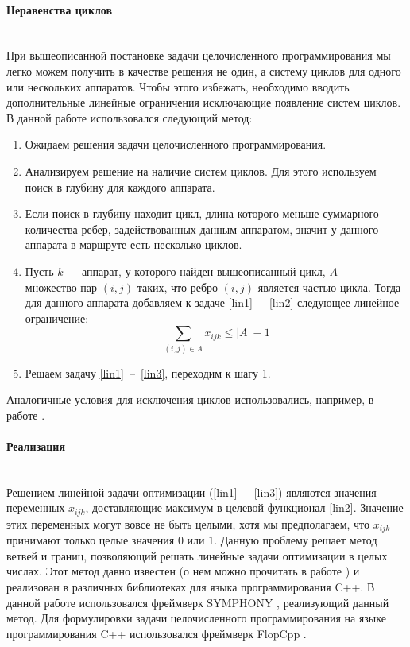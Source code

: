 \documentclass[a4paper,14pt,russian]{article}
\begin{document}
\paragraph{Неравенства циклов} ~\\

При вышеописанной постановке задачи целочисленного программирования мы легко можем получить в качестве решения не один, а систему циклов для одного или нескольких аппаратов. Чтобы этого избежать, необходимо вводить дополнительные линейные ограничения исключающие появление систем циклов. В данной работе использовался следующий метод:
\begin{enumerate}
\item  Ожидаем решения задачи целочисленного программирования.
\item Анализируем решение на наличие систем циклов. Для этого используем поиск в глубину для каждого аппарата.
\item Если поиск в глубину находит цикл, длина которого меньше суммарного количества ребер, задействованных данным аппаратом, значит у данного аппарата в маршруте есть несколько циклов.
\item Пусть $k$ ~-- аппарат, у которого найден вышеописанный цикл, $A$ ~-- множество пар $(i, j)$ таких, что ребро $(i, j)$ является частью цикла. Тогда для данного аппарата добавляем к задаче \eqref{lin1}~--~\eqref{lin2} следующее линейное ограничение:
\begin{equation} \label{lin3}
\displaystyle \sum_{(i,j) \in A} x_{i j k} \le |A| - 1
\end{equation}

\item Решаем задачу \eqref{lin1}~--~\eqref{lin3}, переходим к шагу 1.
\end{enumerate}

Аналогичные условия для исключения циклов использовались, например, в работе \cite{shmoys1990analyzing}.

\paragraph{Реализация} ~\\
Решением линейной задачи оптимизации (\eqref{lin1}~--~\eqref{lin3}) являются значения переменных  $x_{i j k}$, доставляющие максимум в целевой функционал \eqref{lin2}.
Значение этих переменных могут вовсе не быть целыми, хотя мы предполагаем, что $x_{i j k}$ принимают только целые значения $0$ или $1$. Данную проблему решает метод ветвей и границ, позволяющий решать линейные задачи оптимизации в целых числах. Этот метод давно известен (о нем можно прочитать в работе \cite{lawler1966branch}) и реализован в различных библиотеках для языка программирования C++.
В данной работе использовался фреймверк SYMPHONY \cite{ralphs2005symphony}, реализующий данный метод.
Для формулировки задачи целочисленного программирования на языке программирования C++ использовался фреймверк FlopCpp \cite{hultberg2007flopc++}.
\end{document}
